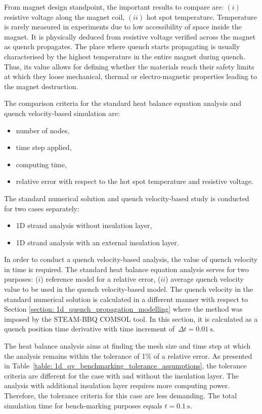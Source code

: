 
From magnet design standpoint, the important results to compare are: $(i)$ resistive voltage along the magnet coil, $(ii)$ hot spot temperature. Temperature is rarely measured in experiments due to low accessibility of space inside the magnet. It is physically deduced from resistive voltage verified across the magnet as quench propagates. The place where quench starts propagating is usually characterised by the highest temperature in the entire magnet during quench. Thus, its value allows for defining whether the materials reach their safety limits at which they loose mechanical, thermal or electro-magnetic properties leading to the magnet destruction.

The comparison criteria for the standard heat balance equation analysis and quench velocity-based simulation are: 
\begin{itemize}
    \item number of nodes,
    \item time step applied,
    \item computing time,
    \item relative error with respect to the hot spot temperature and resistive voltage.
\end{itemize}

The standard numerical solution and quench velocity-based study is conducted for two cases separately: 
\begin{itemize}
    \item 1D strand analysis without insulation layer,
    \item 1D strand analysis with an external insulation layer.
\end{itemize}

In order to conduct a quench velocity-based analysis, the value of quench velocity in time is required. The standard heat balance equation analysis serves for two purposes: ($i$) reference model for a relative error, ($ii$) average quench velocity value to be used in the quench velocity-based model. The quench velocity in the standard numerical solution is calculated in a different manner with respect to Section \ref{section: 1d_quench_propagation_modelling} where the method was imposed by the STEAM-BBQ COMSOL tool. In this section, it is calculated as a quench position time derivative with time increment of~$\Delta t=0.01~\text{s}$. 

The heat balance analysis aims at finding the mesh size and time step at which the analysis remains within the tolerance of 1\% of a relative error. As presented in Table~\ref{table: 1d_qv_benchmarking_tolerance_assumptions}, the tolerance criteria are different for the case with and without the insulation layer. The analysis with additional insulation layer requires more computing power. Therefore, the tolerance criteria for this case are less demanding. The total simulation time for bench-marking purposes equals $t=0.1~\text{s}$.

